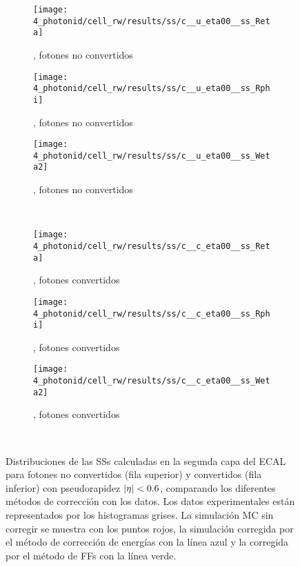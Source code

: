 \begin{figure}[ht!]
    \centering
    \begin{subfigure}[h]{0.32\linewidth}
        \centering
        \texttt{[image: 4\_photonid/cell\_rw/results/ss/c\_\_u\_eta00\_\_ss\_Reta]}
        \caption{\reta, fotones no convertidos}
    \end{subfigure}
    \hfill
    \begin{subfigure}[h]{0.32\linewidth}
        \centering
        \texttt{[image: 4\_photonid/cell\_rw/results/ss/c\_\_u\_eta00\_\_ss\_Rphi]}
        \caption{\rphi, fotones no convertidos}
    \end{subfigure}
    \begin{subfigure}[h]{0.32\linewidth}
        \centering
        \texttt{[image: 4\_photonid/cell\_rw/results/ss/c\_\_u\_eta00\_\_ss\_Weta2]}
        \caption{\weta, fotones no convertidos}
    \end{subfigure}\\
    \begin{subfigure}[h]{0.32\linewidth}
        \centering
        \texttt{[image: 4\_photonid/cell\_rw/results/ss/c\_\_c\_eta00\_\_ss\_Reta]}
        \caption{\reta, fotones convertidos}
    \end{subfigure}
    \hfill
    \begin{subfigure}[h]{0.32\linewidth}
        \centering
        \texttt{[image: 4\_photonid/cell\_rw/results/ss/c\_\_c\_eta00\_\_ss\_Rphi]}
        \caption{\rphi, fotones convertidos}
    \end{subfigure}
    \begin{subfigure}[h]{0.32\linewidth}
        \centering
        \texttt{[image: 4\_photonid/cell\_rw/results/ss/c\_\_c\_eta00\_\_ss\_Weta2]}
        \caption{\weta, fotones convertidos}
    \end{subfigure}\\
    \caption{Distribuciones de las \acp{SS} calculadas en la segunda capa del \ac{ECAL} para fotones no convertidos (fila superior) y convertidos (fila inferior) con pseudorapidez \(|\eta|<0.6\), comparando los diferentes métodos de corrección con los datos. Los datos experimentales están representados por los histogramas grises. La simulación \ac{MC} sin corregir se muestra con los puntos rojos, la simulación corregida por el método de corrección de energías con la línea azul y la corregida por el método de \acp{FF} con la línea verde.}
    \label{fig:ss_corrections:cell_rw:results:ss}
\end{figure}






